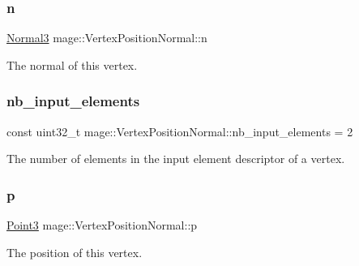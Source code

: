 \subsubsection{\texorpdfstring{n}{n}}
{\footnotesize\ttfamily \hyperlink{structmage_1_1_normal3}{Normal3} mage\+::\+Vertex\+Position\+Normal\+::n}

The normal of this vertex. \hypertarget{structmage_1_1_vertex_position_normal_a7ccf8843b44100cfdd8ad9bc30228f94}{}\label{structmage_1_1_vertex_position_normal_a7ccf8843b44100cfdd8ad9bc30228f94} 
\subsubsection{\texorpdfstring{nb\+\_\+input\+\_\+elements}{nb\_input\_elements}}
{\footnotesize\ttfamily const uint32\+\_\+t mage\+::\+Vertex\+Position\+Normal\+::nb\+\_\+input\+\_\+elements = 2\hspace{0.3cm}{\ttfamily [static]}}

The number of elements in the input element descriptor of a vertex. \hypertarget{structmage_1_1_vertex_position_normal_ac95e9941363ec5687f0bf21e59b83940}{}\label{structmage_1_1_vertex_position_normal_ac95e9941363ec5687f0bf21e59b83940} 
\subsubsection{\texorpdfstring{p}{p}}
{\footnotesize\ttfamily \hyperlink{structmage_1_1_point3}{Point3} mage\+::\+Vertex\+Position\+Normal\+::p}

The position of this vertex. 